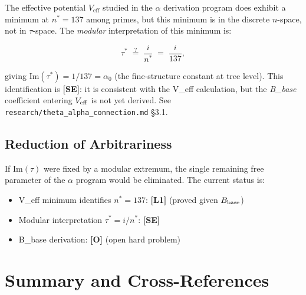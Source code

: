 \documentclass[11pt,a4paper]{article}
\begin{document}
The effective potential $V_{\mathrm{eff}}$ studied in the $\alpha$ derivation
program does exhibit a minimum at $n^* = 137$ among primes, but this minimum
is in the discrete $n$-space, not in $\tau$-space. The \emph{modular}
interpretation of this minimum is:

\begin{equation}
  \tau^* \;\stackrel{?}{=}\; \frac{i}{n^*} \;=\; \frac{i}{137},
\end{equation}

giving $\mathrm{Im}(\tau^*) = 1/137 = \alpha_0$ (the fine-structure constant
at tree level). This identification is \textbf{[SE]}: it is consistent with
the V_eff calculation, but the \emph{B\_base} coefficient entering $V_{\rm eff}$
is not yet derived. See \texttt{research/theta\_alpha\_connection.md} §3.1.

\subsection{Reduction of Arbitrariness}

If $\mathrm{Im}(\tau)$ were fixed by a modular extremum, the single remaining
free parameter of the $\alpha$ program would be eliminated. The current status is:

\begin{itemize}
  \item V_eff minimum identifies $n^* = 137$: \textbf{[L1]} (proved given $B_{\rm base}$)
  \item Modular interpretation $\tau^* = i/n^*$: \textbf{[SE]}
  \item B_base derivation: \textbf{[O]} (open hard problem)
\end{itemize}

\section{Summary and Cross-References}
\label{sec:summary}
\end{document}
